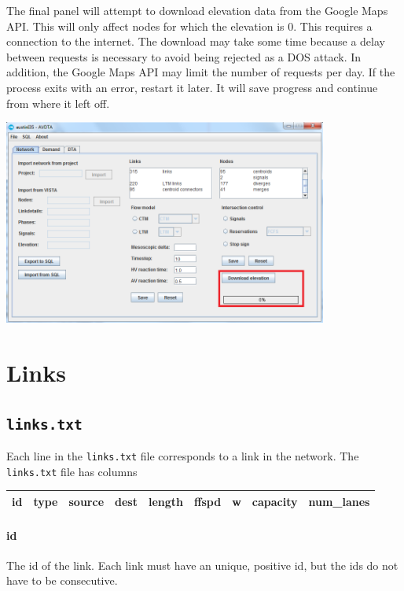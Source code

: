 The final panel will attempt to download elevation data from the Google Maps API. This will only affect nodes for which the elevation is 0. This requires a connection to the internet. The download may take some time because a delay between requests is necessary to avoid being rejected as a DOS attack. In addition, the Google Maps API may limit the number of requests per day. If the process exits with an error, restart it later. It will save progress and continue from where it left off.
\begin{center}
\includegraphics[width=0.8\textwidth]{images/nodes3.png}
\end{center}





\section{Links}
\label{sec:links}

\subsection{\texttt{links.txt}}

Each line in the \texttt{links.txt} file corresponds to a link in the network. The \texttt{links.txt} file has columns
\begin{center}
\begin{tabular}{ccccccccc}
\hline
id & type & source & dest & length & ffspd & w & capacity & num\_lanes \\\hline
\end{tabular}
\end{center}
\paragraph*{id} The id of the link. Each link must have an unique, positive id, but the ids do not have to be consecutive.
